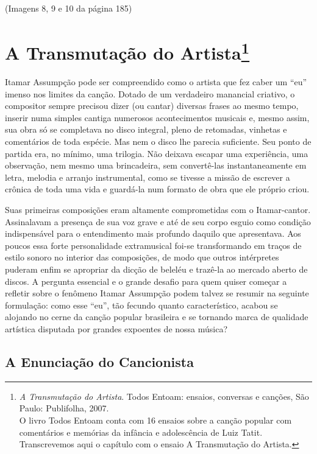 (Imagens 8, 9 e 10 da página 185)

\chapter{A Transmutação do Artista\footnote{\emph{A Transmutação do Artista}. Todos Entoam: ensaios, conversas e
canções, São Paulo: Publifolha, 2007.\\
O livro Todos Entoam conta com 16 ensaios sobre a canção
popular com comentários e memórias da infância e adolescência de Luiz
Tatit. Transcrevemos aqui o capítulo com o ensaio A Transmutação do
Artista.}}


Itamar Assumpção pode ser compreendido como o artista que fez caber um
``eu'' imenso nos limites da canção. Dotado de um verdadeiro manancial
criativo, o compositor sempre precisou dizer (ou cantar) diversas frases
ao mesmo tempo, inserir numa simples cantiga numerosos acontecimentos
musicais e, mesmo assim, sua obra só se completava no disco integral,
pleno de retomadas, vinhetas e comentários de toda espécie. Mas nem o
disco lhe parecia suficiente. Seu ponto de partida era, no mínimo, uma
trilogia. Não deixava escapar uma experiência, uma observação, nem mesmo
uma brincadeira, sem convertê-las instantaneamente em letra, melodia e
arranjo instrumental, como se tivesse a missão de escrever a crônica de
toda uma vida e guardá-la num formato de obra que ele próprio criou.

Suas primeiras composições eram altamente comprometidas com o
Itamar-cantor. Assinalavam a presença de sua voz grave e até de seu
corpo esguio como condição indispensável para o entendimento mais
profundo daquilo que apresentava. Aos poucos essa forte personalidade
extramusical foi-se transformando em traços de estilo sonoro no interior
das composições, de modo que outros intérpretes puderam enfim se
apropriar da dicção de beleléu e trazê-la ao mercado aberto de discos. A
pergunta essencial e o grande desafio para quem quiser começar a
refletir sobre o fenômeno Itamar Assumpção podem talvez se resumir na
seguinte formulação: como esse ``eu'', tão fecundo quanto
característico, acabou se alojando no cerne da canção popular brasileira
e se tornando marca de qualidade artística disputada por grandes
expoentes de nossa música?

\section{A Enunciação do Cancionista}

